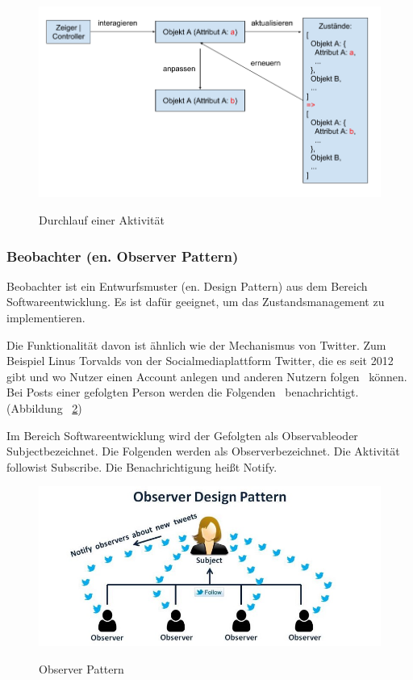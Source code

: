\begin{figure}[ht]
\centering
\caption[Durchlauf einer Aktivität]{Durchlauf einer Aktivität}
\includegraphics[width=\textwidth]{images/interaktionVerlauf.png}
\label{fig:interaktionVerlauf} 
\end{figure}
 
  \subsubsection{Beobachter (en. Observer Pattern)}
  Beobachter ist ein Entwurfsmuster (en. Design Pattern) aus dem Bereich Softwareentwicklung. Es ist dafür geeignet, um das Zustandsmanagement zu implementieren.
  
  Die Funktionalität davon ist ähnlich wie der Mechanismus von Twitter. Zum Beispiel Linus Torvalds \citep{42} von der Socialmediaplattform Twitter, die es seit 2012 gibt und wo Nutzer einen Account anlegen und anderen Nutzern \glqq folgen \grqq\ können. Bei Posts einer gefolgten Person werden die \glqq Folgenden \grqq\ benachrichtigt. (Abbildung ~\ref{fig:observerPatern})
  
  Im Bereich Softwareentwicklung wird der Gefolgten als \glqq Observable\grqq oder \glqq Subject\grqq bezeichnet. Die Folgenden werden als \glqq Observer\grqq bezeichnet. Die Aktivität \glqq follow\grqq ist \glqq Subscribe\grqq. Die Benachrichtigung heißt \glqq Notify\grqq.
  
\begin{figure}[ht]
\centering
\caption[Observer Pattern]{Observer Pattern}
\includegraphics[width=\textwidth]{images/observerPattern.jpeg}
\label{fig:observerPatern} 
\end{figure}
  
